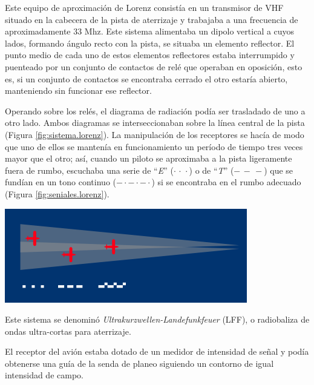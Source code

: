 Este equipo de aproximaci\'on de Lorenz consist\'ia en un transmisor de VHF situado en la cabecera de la pista de aterrizaje y trabajaba a una frecuencia de aproximadamente 33 Mhz. Este sistema alimentaba un dipolo vertical a cuyos lados, formando \'angulo recto con la pista, se situaba un elemento reflector. El punto medio de cada uno de estos elementos reflectores estaba interrumpido y puenteado por un conjunto de contactos de rel\'e que operaban en oposici\'on, esto es, si un conjunto de contactos se encontraba cerrado el otro estar\'ia abierto, manteniendo sin funcionar ese reflector.

\begin{minipage}[c]{0.5\linewidth}
Operando sobre los rel\'es, el diagrama de radiaci\'on pod\'ia ser trasladado de uno a otro lado. Ambos diagramas se interseccionaban sobre la l\'inea central de la pista  (Figura \ref{fig:sistema.lorenz}). La manipulaci\'on de los receptores se hac\'ia de modo que uno de ellos se manten\'ia en funcionamiento un per\'iodo de tiempo tres veces mayor que el otro; as\'i, cuando un piloto se aproximaba a la pista ligeramente fuera de rumbo, escuchaba una serie de ``\emph{E}'' ($\cdot \, \cdot \, \cdot$) o de ``\emph{T}'' ($- \, - \, -$) que se fund\'ian en un tono continuo ($- \cdot - \cdot - \cdot$) si se encontraba en el rumbo adecuado (Figura \ref{fig:seniales.lorenz}).

\end{minipage}
\begin{minipage}[c]{0.5\linewidth}
\centering
  \includegraphics[width=0.9\linewidth]{06.radionavegacion/Imagenes/06.02.vor.imagenes/Lorenz_beam.png}
  \label{fig:seniales.lorenz}
\end{minipage}

 Este sistema se denomin\'o \emph{Ultrakurzwellen-Landefunkfeuer} (LFF), o radiobaliza de ondas ultra-cortas para aterrizaje.

El receptor del avi\'on estaba dotado de un medidor de intensidad de se\~nal y pod\'ia obtenerse una gu\'ia de la senda de planeo siguiendo un contorno de igual intensidad de campo.

